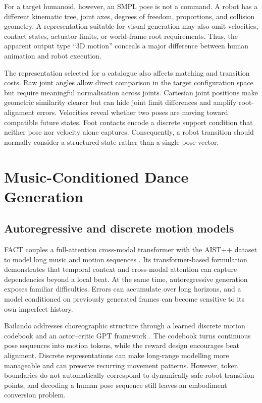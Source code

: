 For a target humanoid, however, an SMPL pose is not a command. A robot has a
different kinematic tree, joint axes, degrees of freedom, proportions, and
collision geometry. A representation suitable for visual generation may also
omit velocities, contact states, actuator limits, or world-frame root
requirements. Thus, the apparent output type ``3D motion'' conceals a major
difference between human animation and robot execution.

The representation selected for a catalogue also affects matching and
transition costs. Raw joint angles allow direct comparison in the target
configuration space but require meaningful normalisation across joints.
Cartesian joint positions make geometric similarity clearer but can hide joint
limit differences and amplify root-alignment errors. Velocities reveal whether
two poses are moving toward compatible future states. Foot contacts encode a
discrete support condition that neither pose nor velocity alone captures.
Consequently, a robot transition should normally consider a structured state
rather than a single pose vector.

\section{Music-Conditioned Dance Generation}
\label{sec:lit_dance_generation}

\subsection{Autoregressive and discrete motion models}
\label{subsec:lit_autoregressive}

FACT couples a full-attention cross-modal transformer with the AIST++ dataset
to model long music and motion sequences \cite{li2021ai}. Its transformer-based
formulation demonstrates that temporal context and cross-modal attention can
capture dependencies beyond a local beat. At the same time, autoregressive
generation exposes familiar difficulties. Errors can accumulate over long
horizons, and a model conditioned on previously generated frames can become
sensitive to its own imperfect history.

Bailando addresses choreographic structure through a learned discrete motion
codebook and an actor--critic GPT framework \cite{siyao2022bailando}. The
codebook turns continuous pose sequences into motion tokens, while the reward
design encourages beat alignment. Discrete representations can make long-range
modelling more manageable and can preserve recurring movement patterns.
However, token boundaries do not automatically correspond to dynamically safe
robot transition points, and decoding a human pose sequence still leaves an
embodiment conversion problem.


